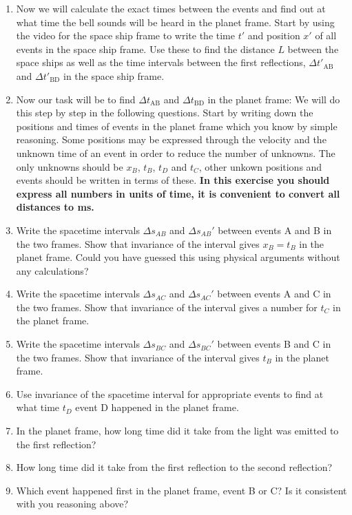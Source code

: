 {\begin{multicols}{2}
\begin{enumerate}
\item Now we will calculate the exact times between the events and find out at what time the bell sounds will be heard in the planet frame. Start by using the video for the space ship frame to write the time $t'$ and position $x'$ of all events in the space ship frame. Use these to find the distance $L$ between the space ships as well as the time intervals between the first reflections, $\Delta t'_\mathrm{AB}$ and $\Delta t'_\mathrm{BD}$ in the space ship frame.

\item Now our task will be to find $\Delta t_\mathrm{AB}$ and $\Delta t_\mathrm{BD}$ in the planet frame: We will do this step by step in the following questions. Start by writing down the positions and times of events in the planet frame which you know by simple reasoning. Some positions may be expressed through the velocity and the unknown time of an event in order to reduce the number of unknowns. The only unknowns should be $x_B$, $t_B$, $t_D$ and $t_C$, other unkown positions and events should be written in terms of these. {\bf In this exercise you should express all numbers in units of time, it is convenient to convert all distances to ms.}
\item Write the spacetime intervals $\Delta s_{AB}$ and $\Delta s_{AB}'$ between events A and B in the two frames. Show that invariance of the interval gives $x_B=t_B$ in the planet frame. Could you have guessed this using physical arguments without any calculations?
\item  Write the spacetime intervals $\Delta s_{AC}$ and $\Delta s_{AC}'$ between events A and C in the two frames. Show that invariance of the interval gives a number for $t_C$ in the planet frame. 
\item Write the spacetime intervals $\Delta s_{BC}$ and $\Delta s_{BC}'$ between events B and C in the two frames. Show that invariance of the interval gives $t_B$ in the planet frame.
\item Use invariance of the spacetime interval for appropriate events to find at what time $t_D$ event D happened in the planet frame. 
\item In the planet frame, how long time did it take from the light was emitted to the first reflection? 
\item How long time did it take from the first reflection to the second reflection?
\item Which event happened first in the planet frame, event B or C? Is it consistent with you reasoning above?
\end{enumerate}





\end{multicols}}
